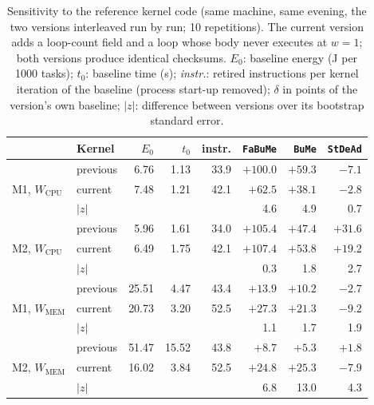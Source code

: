 \begin{table}[t]
\caption{Sensitivity to the reference kernel code (same machine, same evening, the two versions interleaved run by run; 10 repetitions). The current version adds a loop-count field and a loop whose body never executes at $w = 1$; both versions produce identical checksums. $E_0$: baseline energy (J per 1000 tasks); $t_0$: baseline time (s); \emph{instr.}: retired instructions per kernel iteration of the baseline (process start-up removed); $\delta$ in points of the version's own baseline; $|z|$: difference between versions over its bootstrap standard error.}
\label{tab:kernel}
\centering\small
\begin{tabular}{llrrrrrr}
\toprule
& \textbf{Kernel} & $E_0$ & $t_0$ & \textbf{instr.} & \texttt{FaBuMe} & \texttt{BuMe} & \texttt{StDeAd}\\
\midrule
\multirow{3}{*}{M1, $W_{\text{CPU}}$} & previous & 6.76 & 1.13 & 33.9 & $+100.0$ & $+59.3$ & $-7.1$\\
 & current & 7.48 & 1.21 & 42.1 & $+62.5$ & $+38.1$ & $-2.8$\\
 & $|z|$ & & & & 4.6 & 4.9 & 0.7\\
\midrule
\multirow{3}{*}{M2, $W_{\text{CPU}}$} & previous & 5.96 & 1.61 & 34.0 & $+105.4$ & $+47.4$ & $+31.6$\\
 & current & 6.49 & 1.75 & 42.1 & $+107.4$ & $+53.8$ & $+19.2$\\
 & $|z|$ & & & & 0.3 & 1.8 & 2.7\\
\midrule
\multirow{3}{*}{M1, $W_{\text{MEM}}$} & previous & 25.51 & 4.47 & 43.4 & $+13.9$ & $+10.2$ & $-2.7$\\
 & current & 20.73 & 3.20 & 52.5 & $+27.3$ & $+21.3$ & $-9.2$\\
 & $|z|$ & & & & 1.1 & 1.7 & 1.9\\
\midrule
\multirow{3}{*}{M2, $W_{\text{MEM}}$} & previous & 51.47 & 15.52 & 43.8 & $+8.7$ & $+5.3$ & $+1.8$\\
 & current & 16.02 & 3.84 & 52.5 & $+24.8$ & $+25.3$ & $-7.9$\\
 & $|z|$ & & & & 6.8 & 13.0 & 4.3\\
\bottomrule
\end{tabular}
\end{table}
